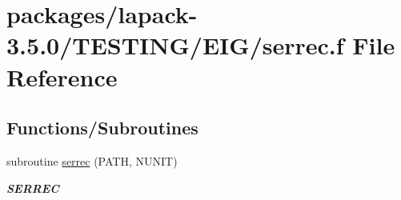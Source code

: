 \hypertarget{serrec_8f}{}\section{packages/lapack-\/3.5.0/\+T\+E\+S\+T\+I\+N\+G/\+E\+I\+G/serrec.f File Reference}
\label{serrec_8f}
\subsection*{Functions/\+Subroutines}
\begin{DoxyCompactItemize}
\item 
subroutine \hyperlink{group__single__eig_ga53ee6e84c6661f0c5f453945a0c6693d}{serrec} (P\+A\+T\+H, N\+U\+N\+I\+T)
\begin{DoxyCompactList}\small\item\em {\bfseries S\+E\+R\+R\+E\+C} \end{DoxyCompactList}\end{DoxyCompactItemize}
